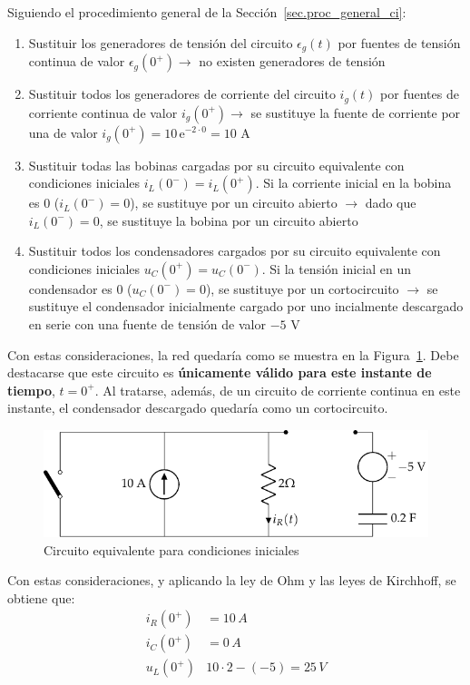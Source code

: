 \begin{example}
Siguiendo el procedimiento general de la Sección~\ref{sec.proc_general_ci}:
\begin{enumerate}
		\item Sustituir los generadores de tensión del circuito $\epsilon_g(t)$ por fuentes de tensión continua de valor $\epsilon_g(0^+) \rightarrow$ no existen generadores de tensión
		\item Sustituir todos los generadores de corriente del circuito $i_g(t)$ por fuentes de corriente continua de valor $i_g(0^+)\rightarrow$ se sustituye la fuente de corriente por una de valor $i_g(0^+)=10\,\mathrm{e}^{-2\cdot 0}=10$ A
		\item Sustituir todas las bobinas cargadas por su circuito equivalente con condiciones iniciales $i_L(0^-)=i_L(0^+)$. Si la corriente inicial en la bobina es 0 ($i_L(0^-)=0$), se sustituye por un circuito abierto $\rightarrow$ dado que $i_L(0^-)=0$, se sustituye la bobina por un circuito abierto
		\item Sustituir todos los condensadores cargados por su circuito equivalente con condiciones iniciales $u_C(0^+)=u_C(0^-)$. Si la tensión inicial en un condensador es 0 ($u_C(0^-)=0$), se sustituye por un cortocircuito $\rightarrow$ se sustituye el condensador inicialmente cargado por uno incialmente descargado en serie con una fuente de tensión de valor $-5$ V
	\end{enumerate}
	Con estas consideraciones, la red quedaría como se muestra en la Figura~\ref{fig.ej_cond_iniciales_0+}. Debe destacarse que este circuito es \textbf{únicamente válido para este instante de tiempo}, $t=0^+$. Al tratarse, además, de un circuito de corriente continua en este instante, el condensador descargado quedaría como un cortocircuito.  
	\begin{figure}[H]
	    \centering
	    \includegraphics{../figs/ej_cond_iniciales_0+.pdf}
	    \caption{Circuito equivalente para condiciones iniciales}
	    \label{fig.ej_cond_iniciales_0+}
	\end{figure}
	
	Con estas consideraciones, y aplicando la ley de Ohm y las leyes de Kirchhoff, se obtiene que:
	\begin{align*}
	    i_R(0^+)&=10\,A\\
	    i_C(0^+)&=0\,A\\
	    u_L(0^+)&10\cdot 2 - (-5)=25\,V
	\end{align*}
	
	\end{example}

